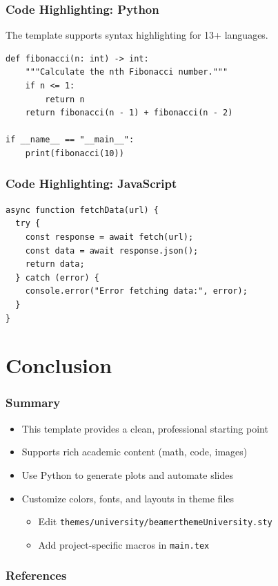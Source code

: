 \documentclass[aspectratio=169]{beamer}
\begin{document}
\begin{frame}[fragile]
    \frametitle{Code Highlighting: Python}
    The template supports syntax highlighting for 13+ languages.
    \begin{lstlisting}[style=pythonstyle, caption=Example Python Code]
def fibonacci(n: int) -> int:
    """Calculate the nth Fibonacci number."""
    if n <= 1:
        return n
    return fibonacci(n - 1) + fibonacci(n - 2)

if __name__ == "__main__":
    print(fibonacci(10))
\end{lstlisting}
\end{frame}

\begin{frame}[fragile]
    \frametitle{Code Highlighting: JavaScript}
    \begin{lstlisting}[style=javascriptstyle, caption=Example JavaScript Code]
async function fetchData(url) {
  try {
    const response = await fetch(url);
    const data = await response.json();
    return data;
  } catch (error) {
    console.error("Error fetching data:", error);
  }
}
\end{lstlisting}
\end{frame}

\section{Conclusion}

\begin{frame}
    \frametitle{Summary}
    \begin{itemize}
        \item This template provides a clean, professional starting point
        \item Supports rich academic content (math, code, images)
        \item Use Python to generate plots and automate slides
        \item Customize colors, fonts, and layouts in theme files
              \begin{itemize}
                  \item Edit \texttt{themes/university/beamerthemeUniversity.sty}
                  \item Add project-specific macros in \texttt{main.tex}
              \end{itemize}
    \end{itemize}
\end{frame}

\begin{frame}[allowframebreaks]
    \frametitle{References}
    \printbibliography
\end{frame}
\end{document}
